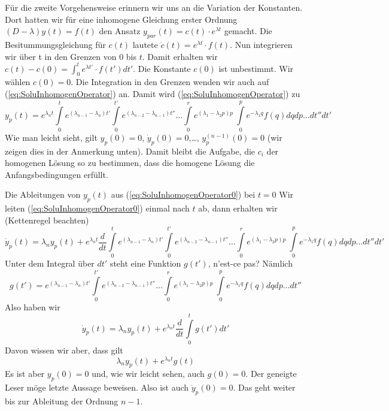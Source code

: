 Für die zweite Vorgehensweise erinnern wir uns an die Variation der Konstanten.
Dort hatten wir für eine inhomogene Gleichung erster Ordnung
$(D-\lambda)y(t)=f(t)$ den Ansatz $y_{par}(t)=c(t)\cdot e^{\lambda t}$ gemacht.
Die Besitummungsgleichung für $c(t)$ lautete $\dot c(t)=e^{\lambda t}\cdot
f(t)$. Nun integrieren wir über t in den Grenzen von $0$ bis $t$. Damit
erhalten wir $c(t)-c(0)=\int_0^te^{\lambda t'}\cdot f(t')dt'$. Die Konstante
$c(0)$ ist unbestimmt. Wir wählen $c(0)=0$. Die Integration in den Grenzen
wenden wir auch auf (\ref{eq:SoluInhomogenOperator}) an. Damit wird
(\ref{eq:SoluInhomogenOperator}) zu
\begin{equation}
  y_p(t)=e^{\lambda_n t}
\int\limits_0^t e^{(\lambda_{n-1}-\lambda_n) t'}
\int\limits_0^{t'} e^{(\lambda_{n-2}-\lambda_{n-1}) t''}\dots
\int\limits_0^{r} e^{(\lambda_{1}-\lambda_{2}p) p}\
\int\limits_0^{p} e^{-\lambda_{1}q}f(q)dqdp\dots dt''dt'
  \label{eq:SoluInhomogenOperator0}
\end{equation}
Wie man leicht sieht, gilt $y_p(0)=0$, $\dot y_p(0)=0$,\ldots,
$y^{(n-1)}_p(0)=0$ (wir zeigen dies in der Anmerkung unten). Damit bleibt die
Aufgabe, die $c_i$ der homogenen Lösung so zu bestimmen, dass die homogene
Lösung die Anfangsbedingungen erfüllt.
\begin{note}{Die Ableitungen von $y_p(t)$ aus (\ref{eq:SoluInhomogenOperator0}) bei $t=0$}
Wir leiten (\ref{eq:SoluInhomogenOperator0}) einmal nach $t$ ab, dann erhalten
wir (Kettenregel beachten)
\[ \dot y_p(t)=\lambda_n y_p(t)+
e^{\lambda_n t}\frac{d}{dt}
\int\limits_0^t e^{(\lambda_{n-1}-\lambda_n) t'}
\int\limits_0^{t'} e^{(\lambda_{n-2}-\lambda_{n-1}) t''}\dots
\int\limits_0^{r} e^{(\lambda_{1}-\lambda_{2}p) p}\
\int\limits_0^{p} e^{-\lambda_{1}q}f(q)dqdp\dots dt''dt'\
\]
Unter dem Integral über $dt'$ steht eine Funktion $g(t')$, n'est-ce pas? Nämlich
\[g(t')=e^{(\lambda_{n-1}-\lambda_n) t'}
\int\limits_0^{t'} e^{(\lambda_{n-2}-\lambda_{n-1}) t''}\dots
\int\limits_0^{r} e^{(\lambda_{1}-\lambda_{2}p) p}\
\int\limits_0^{p} e^{-\lambda_{1}q}f(q)dqdp\dots dt''
\]
Also haben wir
\[ \dot y_p(t)=\lambda_n y_p(t)+e^{\lambda_n t}\frac{d}{dt}
\int\limits_0^t g(t')dt'
\]
Davon wissen wir aber, dass gilt
\[ \lambda_n y_p(t)+e^{\lambda_n t} g(t)
\]
Es ist aber $y_p(0)=0$ und, wie wir leicht sehen, auch $g(0)=0$. Der geneigte Leser möge letzte Aussage beweisen. Also ist auch $\dot y_p(0)=0$. Das geht weiter bis zur Ableitung der Ordnung $n-1$.
\end{note}
